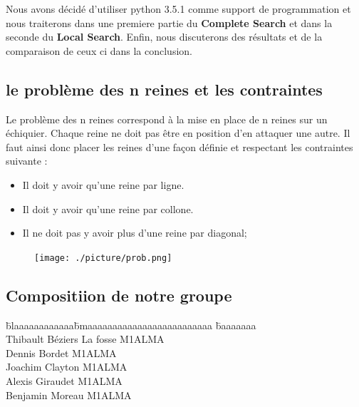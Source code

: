 \documentclass{article}
\begin{document}
Nous avons décidé d'utiliser python 3.5.1 comme support de programmation et
nous traiterons dans une premiere partie du \textbf{Complete Search} et dans la seconde du \textbf{Local Search}.
Enfin, nous discuterons des résultats et de la comparaison de ceux ci dans la conclusion.


\vspace{1cm}

\subsection{le problème des n reines et les contraintes}

Le problème des n reines correspond à la mise en place de n reines sur un échiquier. Chaque reine ne doit pas être en position d'en attaquer une autre.
Il faut ainsi donc placer les reines d'une façon définie et respectant les contraintes suivante :

\begin{itemize}
\item Il doit y avoir qu'une reine par ligne.
\item Il doit y avoir qu'une reine par collone.
\item Il ne doit pas y avoir plus d'une reine par diagonal;
\end{itemize}


\begin{figure}[h]

\begin{center}
\texttt{[image: ./picture/prob.png]}
\end{center}

\end{figure}


\newpage
\subsection{Compositiion de notre groupe}

\vspace{1cm}

\begin{tabbing}


\=blaaaaaaaaaaaa\=bmaaaaaaaaaaaaaaaaaaaaaaaaa   \=baaaaaaa\kill \\
\>Thibault 	\>Béziers La fosse		\>M1ALMA\\
\>Dennis	\>Bordet			\>M1ALMA\\
\>Joachim	\>Clayton			\>M1ALMA\\
\>Alexis	\>Giraudet			\>M1ALMA\\
\>Benjamin 	\>Moreau			\>M1ALMA\\


\end{tabbing}
\end{document}
